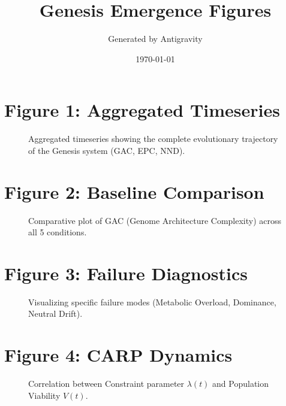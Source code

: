 \documentclass{article}
\title{Genesis Emergence Figures}
\author{Generated by Antigravity}
\date{\today}
\begin{document}
\maketitle

\section*{Figure 1: Aggregated Timeseries}
\begin{figure}[h]
    \centering
    
    \caption{Aggregated timeseries showing the complete evolutionary trajectory of the Genesis system (GAC, EPC, NND).}
\end{figure}

\section*{Figure 2: Baseline Comparison}
\begin{figure}[h]
    \centering
    
    \caption{Comparative plot of GAC (Genome Architecture Complexity) across all 5 conditions.}
\end{figure}

\section*{Figure 3: Failure Diagnostics}
\begin{figure}[h]
    \centering
    
    \caption{Visualizing specific failure modes (Metabolic Overload, Dominance, Neutral Drift).}
\end{figure}

\section*{Figure 4: CARP Dynamics}
\begin{figure}[h]
    \centering
    
    \caption{Correlation between Constraint parameter $\lambda(t)$ and Population Viability $V(t)$.}
\end{figure}
\end{document}
